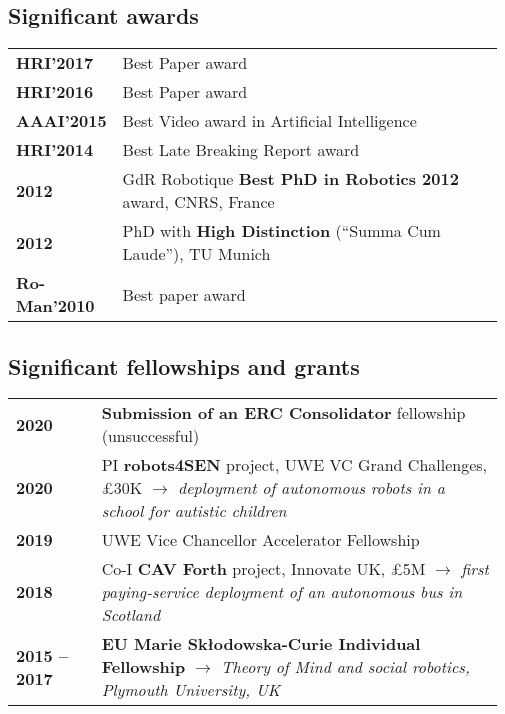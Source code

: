 \subsection{Significant awards}

\begin{tabular}{p{0.17\linewidth}p{0.8\linewidth}}
    \bf HRI'2017  & Best Paper award\\
    \bf HRI'2016  & Best Paper award\\
    \bf AAAI'2015  & Best Video award in Artificial Intelligence\\
    \bf HRI'2014  & Best Late Breaking Report award\\
    \bf 2012         & GdR Robotique {\bf Best PhD in Robotics 2012} award, CNRS, France \\
    \bf 2012         & PhD with {\bf High Distinction} (“Summa Cum Laude”), TU Munich\\
    \bf Ro-Man'2010  & Best paper award\\
\end{tabular}

\subsection{Significant fellowships and grants}

\begin{tabular}{p{0.17\linewidth}p{0.8\linewidth}}
    \bf 2020 & \textbf{Submission of an ERC Consolidator} fellowship (unsuccessful) \\
    \bf 2020 & PI \textbf{robots4SEN} project, UWE VC Grand Challenges, £30K
               \newline \emph{$\rightarrow$ deployment of autonomous robots in a school for autistic
               children}\\
    \bf 2019 & UWE Vice Chancellor Accelerator Fellowship \\
    \bf 2018 & Co-I \textbf{CAV Forth} project, Innovate UK, £5M 
               \newline \emph{$\rightarrow$ first paying-service deployment of an
               autonomous bus in Scotland}\\
    \bf 2015 -- 2017 & {\bf EU Marie Skłodowska-Curie Individual Fellowship}
    \newline \emph{$\rightarrow$ Theory of Mind and social robotics, Plymouth University, UK} \\
\end{tabular}

\vspace{2em}

